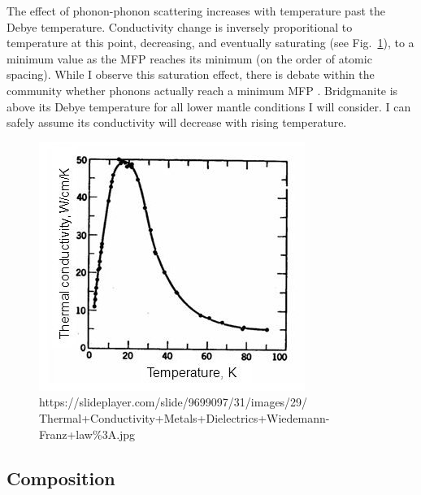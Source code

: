 The effect of phonon-phonon scattering increases with temperature past the Debye temperature. Conductivity change is inversely proporitional to temperature at this point, decreasing, and eventually saturating (see Fig.~\ref{fig:kappa-temp-dep}), to a minimum value as the MFP reaches its 
minimum (on the order of atomic spacing). While I observe this saturation effect, there is debate within the community whether phonons actually reach a minimum MFP \citep[e.g.][]{Ghaderi2017}. Bridgmanite is above its Debye temperature for all lower mantle conditions I will consider. I can safely assume its conductivity will decrease with rising temperature.

\begin{figure}[h!]
  \includegraphics[width=\linewidth]{Figures/kappa-temp-dep.png}
  \caption[KAPPA AGAINST TEMP]{https://slideplayer.com/slide/9699097/31/images/29/
  Thermal+Conductivity+Metals+Dielectrics+Wiedemann-Franz+law\%3A.jpg}
  \label{fig:kappa-temp-dep}
\end{figure}


\subsection{Composition}

